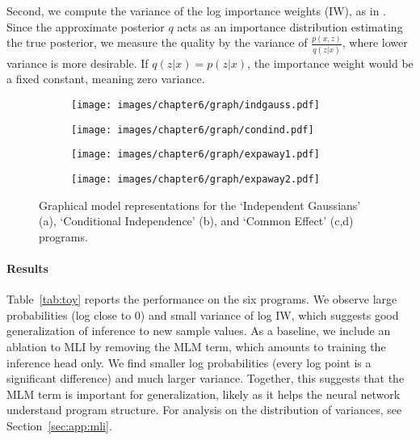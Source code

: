 Second, we compute the variance of the log importance weights (IW), as in \cite{wu2018multimodal}. Since the approximate posterior $q$ acts as an importance distribution estimating the true posterior, we measure the quality by the variance of $\frac{p(x,z)}{q(z|x)}$, where lower variance is more desirable. If $q(z|x) = p(z|x)$, the importance weight would be a fixed constant, meaning zero variance.

\begin{figure}[h!]
  \centering
  \begin{subfigure}[b]{0.24\textwidth}
    \centering
    \texttt{[image: images/chapter6/graph/indgauss.pdf]}
    \caption{}
  \end{subfigure}
  \begin{subfigure}[b]{0.24\textwidth}
    \centering
    \texttt{[image: images/chapter6/graph/condind.pdf]}
    \caption{}
  \end{subfigure}
  \begin{subfigure}[b]{0.24\textwidth}
    \centering
    \texttt{[image: images/chapter6/graph/expaway1.pdf]}
    \caption{}
  \end{subfigure}
  \begin{subfigure}[b]{0.24\textwidth}
    \centering
    \texttt{[image: images/chapter6/graph/expaway2.pdf]}
    \caption{}
  \end{subfigure}
\caption{Graphical model representations for the `Independent Gaussians' (a), `Conditional Independence' (b), and `Common Effect' (c,d) programs.}
\label{fig:graph}
\end{figure}

\paragraph{Results} Table~\ref{tab:toy} reports the performance on the six programs. We observe large probabilities (log close to 0) and small variance of log IW, which suggests good generalization of inference to new sample values. As a baseline, we include an ablation to MLI by removing the MLM term, which amounts to training the inference head only. We find smaller log probabilities (every log point is a significant difference) and much larger variance. Together, this suggests that the MLM term is important for generalization, likely as it helps the neural network understand program structure.
For analysis on the distribution of variances, see Section~\ref{sec:app:mli}.

